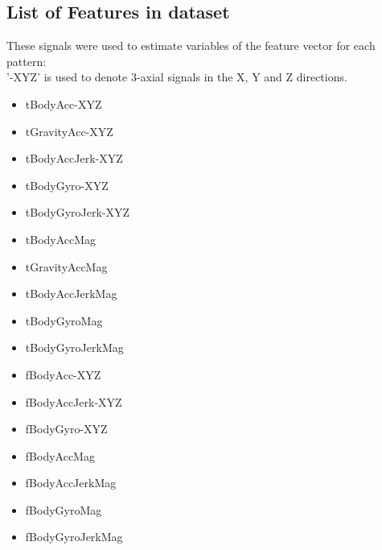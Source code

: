 \documentclass[12pt,a4paper]{report}
\begin{document}
	\subsection{List of Features in dataset}
	These signals were used to estimate variables of the feature vector for each pattern:  \\
	'-XYZ' is used to denote 3-axial signals in the X, Y and Z directions.
	\begin{itemize}
	\item tBodyAcc-XYZ
	\item tGravityAcc-XYZ
	\item tBodyAccJerk-XYZ
	\item tBodyGyro-XYZ
	\item tBodyGyroJerk-XYZ
	\item tBodyAccMag
	\item tGravityAccMag
	\item tBodyAccJerkMag
	\item tBodyGyroMag
	\item tBodyGyroJerkMag
	\item fBodyAcc-XYZ
	\item fBodyAccJerk-XYZ
	\item fBodyGyro-XYZ
	\item fBodyAccMag
	\item fBodyAccJerkMag
	\item fBodyGyroMag
	\item fBodyGyroJerkMag\\


\end{itemize}
\end{document}

